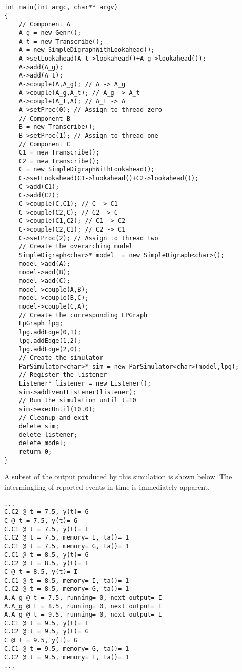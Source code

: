 \begin{verbatim}
int main(int argc, char** argv)
{
    // Component A
    A_g = new Genr();
    A_t = new Transcribe();
    A = new SimpleDigraphWithLookahead();
    A->setLookahead(A_t->lookahead()+A_g->lookahead());
    A->add(A_g);
    A->add(A_t);
    A->couple(A,A_g); // A -> A_g
    A->couple(A_g,A_t); // A_g -> A_t
    A->couple(A_t,A); // A_t -> A
    A->setProc(0); // Assign to thread zero
    // Component B
    B = new Transcribe();
    B->setProc(1); // Assign to thread one
    // Component C
    C1 = new Transcribe();
    C2 = new Transcribe();
    C = new SimpleDigraphWithLookahead();
    C->setLookahead(C1->lookahead()+C2->lookahead());
    C->add(C1);
    C->add(C2);
    C->couple(C,C1); // C -> C1
    C->couple(C2,C); // C2 -> C
    C->couple(C1,C2); // C1 -> C2
    C->couple(C2,C1); // C2 -> C1
    C->setProc(2); // Assign to thread two
    // Create the overarching model
    SimpleDigraph<char>* model  = new SimpleDigraph<char>();
    model->add(A);
    model->add(B);
    model->add(C);
    model->couple(A,B);
    model->couple(B,C);
    model->couple(C,A);
    // Create the corresponding LPGraph
    LpGraph lpg;
    lpg.addEdge(0,1);
    lpg.addEdge(1,2);
    lpg.addEdge(2,0);
    // Create the simulator
    ParSimulator<char>* sim = new ParSimulator<char>(model,lpg);
    // Register the listener
    Listener* listener = new Listener();
    sim->addEventListener(listener);
    // Run the simulation until t=10
    sim->execUntil(10.0);
    // Cleanup and exit
    delete sim;
    delete listener;
    delete model;
    return 0;
}
\end{verbatim}

A subset of the output produced by this simulation is shown below. The intermingling of reported events in time is immediately apparent.
\begin{verbatim}
...
C.C2 @ t = 7.5, y(t)= G
C @ t = 7.5, y(t)= G
C.C1 @ t = 7.5, y(t)= I
C.C2 @ t = 7.5, memory= I, ta()= 1
C.C1 @ t = 7.5, memory= G, ta()= 1
C.C1 @ t = 8.5, y(t)= G
C.C2 @ t = 8.5, y(t)= I
C @ t = 8.5, y(t)= I
C.C1 @ t = 8.5, memory= I, ta()= 1
C.C2 @ t = 8.5, memory= G, ta()= 1
A.A_g @ t = 7.5, running= 0, next output= I
A.A_g @ t = 8.5, running= 0, next output= I
A.A_g @ t = 9.5, running= 0, next output= I
C.C1 @ t = 9.5, y(t)= I
C.C2 @ t = 9.5, y(t)= G
C @ t = 9.5, y(t)= G
C.C1 @ t = 9.5, memory= G, ta()= 1
C.C2 @ t = 9.5, memory= I, ta()= 1
...
\end{verbatim}

